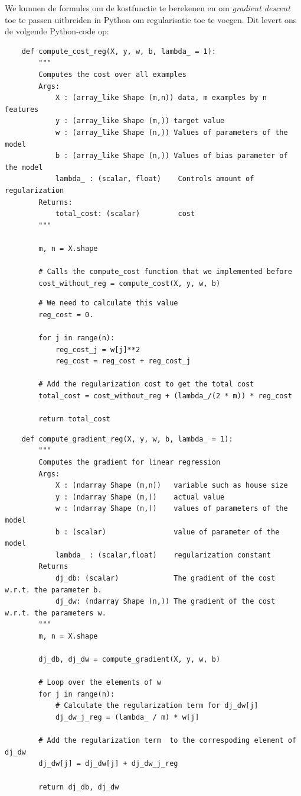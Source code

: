 We kunnen de formules om de kostfunctie te berekenen en om \textit{gradient descent} toe te passen uitbreiden in Python om regularisatie toe te voegen. Dit levert ons de volgende Python-code op:

\begin{lstlisting}
	def compute_cost_reg(X, y, w, b, lambda_ = 1):
	    """
	    Computes the cost over all examples
	    Args:
	        X : (array_like Shape (m,n)) data, m examples by n features
	        y : (array_like Shape (m,)) target value 
	        w : (array_like Shape (n,)) Values of parameters of the model      
	        b : (array_like Shape (n,)) Values of bias parameter of the model
	        lambda_ : (scalar, float)    Controls amount of regularization
	    Returns:
	        total_cost: (scalar)         cost 
	    """
	
	    m, n = X.shape
	
	    # Calls the compute_cost function that we implemented before
	    cost_without_reg = compute_cost(X, y, w, b) 
\end{lstlisting}
\begin{lstlisting}
	    # We need to calculate this value
	    reg_cost = 0.
	
	    for j in range(n):
	        reg_cost_j = w[j]**2
	        reg_cost = reg_cost + reg_cost_j
	
	    # Add the regularization cost to get the total cost
	    total_cost = cost_without_reg + (lambda_/(2 * m)) * reg_cost
	
	    return total_cost
\end{lstlisting}
\begin{lstlisting}	
	def compute_gradient_reg(X, y, w, b, lambda_ = 1): 
	    """
	    Computes the gradient for linear regression 
	    Args:
	        X : (ndarray Shape (m,n))   variable such as house size 
	        y : (ndarray Shape (m,))    actual value 
	        w : (ndarray Shape (n,))    values of parameters of the model      
	        b : (scalar)                value of parameter of the model  
	        lambda_ : (scalar,float)    regularization constant
	    Returns
	        dj_db: (scalar)             The gradient of the cost w.r.t. the parameter b. 
	        dj_dw: (ndarray Shape (n,)) The gradient of the cost w.r.t. the parameters w. 
	    """
	    m, n = X.shape
	
	    dj_db, dj_dw = compute_gradient(X, y, w, b)
	
	    # Loop over the elements of w
	    for j in range(n): 
	        # Calculate the regularization term for dj_dw[j]
	        dj_dw_j_reg = (lambda_ / m) * w[j]
	
	    # Add the regularization term  to the correspoding element of dj_dw
	    dj_dw[j] = dj_dw[j] + dj_dw_j_reg
	
	    return dj_db, dj_dw
\end{lstlisting}